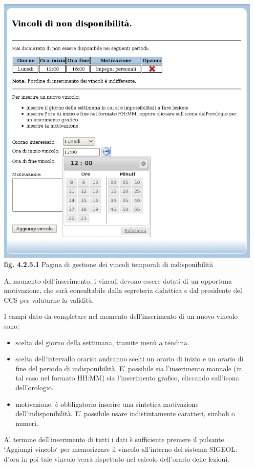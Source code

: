 \documentclass[11pt,a4paper]{article}
\begin{document}
\begin{center}
	\includegraphics[scale=0.5]{images/vincoli_docente.jpg}\\
	\textbf{fig. 4.2.5.1} Pagina di gestione dei vincoli temporali di indisponibilità\\
\end{center}
\bigskip

Al momento dell'inserimento, i vincoli devono essere dotati di un opportuna motivazione, che sarà consultabile dalla segreteria didattica e dal presidente del CCS per valutarne la validità.

I campi dato da completare nel momento dell'inserimento di un nuovo vincolo sono:
\begin{itemize}
 \item scelta del giorno della settimana, tramite menù a tendina.
 \item scelta dell'intervallo orario: andranno scelti un orario di inizio e un orario di fine del periodo di indisponibilità. E' possibile sia l'inserimento manuale (in tal caso nel formato HH:MM) sia l'inserimento grafico, cliccando sull'icona dell'orologio.
 \item motivazione: è obbligatorio inserire una sintetica motivazione dell'indisponibilità. E' possibile usare indistintamente caratteri, simboli o numeri.
\end{itemize}
Al termine dell'inserimento di tutti i dati è sufficiente premere il pulsante `Aggiungi vincolo` per memorizzare il vincolo all'interno del sistema SIGEOL: d'ora in poi tale vincolo verrà rispettato nel calcolo dell'orario delle lezioni.
\end{document}
